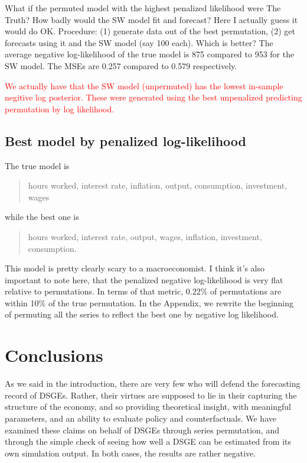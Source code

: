 \documentclass[11pt]{article}
\newcommand{\attn}[1]{\textcolor{red}{#1}}
\begin{document}
What if the permuted model with the highest penalized likelihood were
The Truth? How badly would the SW model fit and forecast? Here I
actually guess it would do OK. Procedure: (1) generate data out of the
best permutation, (2) get forecasts using it and the SW model (say 100
each). Which is better? The average negative log-likelihood of the true
model is 875 compared to 953 for the SW model. The MSEs are 0.257
compared to 0.579 respectively.

\attn{We actually have that the SW model (unpermuted) has the lowest in-sample negitive log posterior. These were generated using the best unpenalized predicting permutation by log likelihood.}

\hypertarget{best-model-by-penalized-log-likelihood}{%
\subsection{Best model by penalized
log-likelihood}\label{best-model-by-penalized-log-likelihood}}

The true model is

\begin{quotation}
hours worked, interest rate, inflation, output, consumption, investment, wages
\end{quotation}

\noindent while the best one is

\begin{quotation}
hours worked, interest rate, output, wages, inflation, investment, consumption.
\end{quotation}

\noindent This model is pretty clearly scary to a macroeconomist. I
think it's also important to note here, that the penalized negative
log-likelihood is very flat relative to permutations. In terms of that
metric, 0.22\% of permutations are within 10\% of the true permutation.
In the Appendix, we rewrite the beginning of \citet{SmetsWouters2007}
permuting all the series to reflect the best one by negative log
likelihood.

\hypertarget{conclusions}{%
\section{Conclusions}\label{conclusions}}

As we said in the introduction, there are very few who will defend the
forecasting record of DSGEs. Rather, their virtues are supposed to lie
in their capturing the structure of the economy, and so providing
theoretical insight, with meaningful parameters, and an ability to
evaluate policy and counterfactuals. We have examined these claims on
behalf of DSGEs through series permutation, and through the simple check
of seeing how well a DSGE can be estimated from its own simulation
output. In both cases, the results are rather negative.
\end{document}
